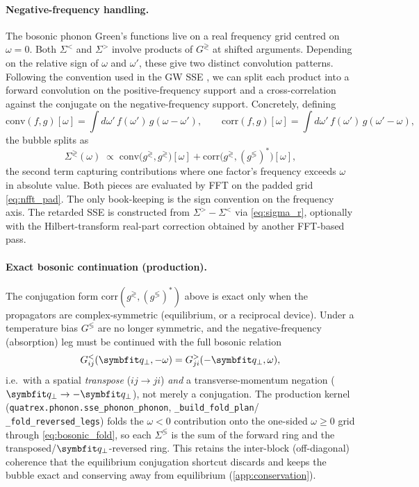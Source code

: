 \paragraph{Negative-frequency handling.} The bosonic phonon Green's
functions live on a real frequency grid centred on $\omega=0$. Both
$\Sigma^{<}$ and $\Sigma^{>}$ involve products of $G^{\gtrless}$ at
shifted arguments. Depending on the relative sign of $\omega$ and
$\omega'$, these give two distinct convolution patterns. Following
the convention used in the GW SSE
\cite{deuschle_electron-electron_2025}, we can split each product into a
forward convolution on the positive-frequency support and a
cross-correlation against the conjugate on the negative-frequency
support. Concretely, defining
\begin{equation}
  \mathrm{conv}(f,g)[\omega]
    = \int\!d\omega'\,f(\omega')\,g(\omega-\omega'),
  \qquad
  \mathrm{corr}(f,g)[\omega]
    = \int\!d\omega'\,f(\omega')\,g(\omega'-\omega),
\end{equation}
the bubble splits as
\begin{equation}
  \Sigma^{\gtrless}(\omega) \;\propto\;
    \mathrm{conv}\bigl(g^{\gtrless},g^{\gtrless}\bigr)[\omega]
    + \mathrm{corr}\bigl(g^{\gtrless},(g^{\lessgtr})^{*}\bigr)[\omega],
\end{equation}
the second term capturing contributions where one factor's frequency
exceeds $\omega$ in absolute value. Both pieces are evaluated by FFT
on the padded grid \cref{eq:nfft_pad}. The only book-keeping is the
sign convention on the frequency axis. The retarded SSE is
constructed from $\Sigma^{>}-\Sigma^{<}$ via \cref{eq:sigma_r},
optionally with the Hilbert-transform real-part correction obtained
by another FFT-based pass.

\paragraph{Exact bosonic continuation (production).}
The conjugation form $\mathrm{corr}(g^{\gtrless},(g^{\lessgtr})^{*})$ above is
exact only when the propagators are complex-symmetric (equilibrium, or a
reciprocal device). Under a temperature bias $G^{\lessgtr}$ are no longer
symmetric, and the negative-frequency (absorption) leg must be continued with
the full bosonic relation
\begin{equation}\label{eq:bosonic_fold}
  G^{<}_{ij}(\qp,-\omega) = G^{>}_{ji}(-\qp,\omega),
\end{equation}
i.e.\ with a spatial \emph{transpose} ($ij\to ji$) \emph{and} a transverse-momentum
negation ($\qp\to-\qp$), not merely a conjugation. The production kernel
(\texttt{quatrex.phonon.sse\_phonon\_phonon}, \texttt{\_build\_fold\_plan}/%
\texttt{\_fold\_reversed\_legs}) folds the $\omega<0$ contribution onto the
one-sided $\omega\ge0$ grid through \cref{eq:bosonic_fold}, so each
$\Sigma^{\lessgtr}$ is the sum of the forward ring and the
transposed/$\qp$-reversed ring. This retains the inter-block (off-diagonal)
coherence that the equilibrium conjugation shortcut discards and keeps the bubble
exact and conserving away from equilibrium (\cref{app:conservation}).

